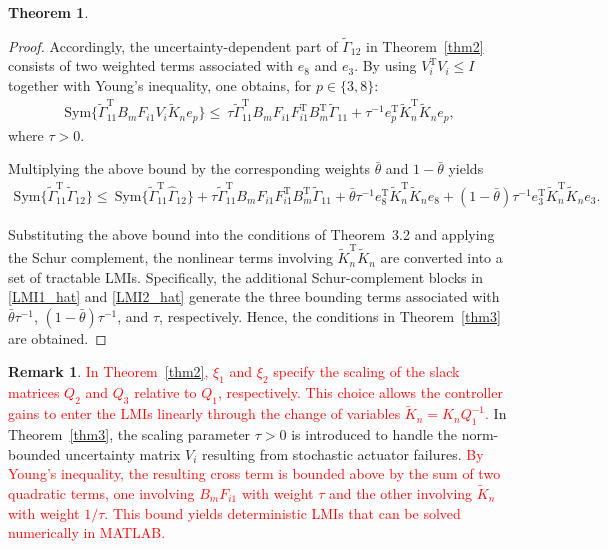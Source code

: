 \documentclass[preprint,review,fleqn,sort&compress,3p]{elsarticle}
\theoremstyle{definition} %
\theoremstyle{definition}%
\newtheorem{thm}{Theorem}[section]
\newtheorem{rem}{Remark}[section]
\begin{document}
\begin{thm}
\begin{proof}
			Accordingly, the uncertainty-dependent part of
			$\widetilde{\Gamma}_{12}$ in Theorem~\ref{thm2} consists of two weighted terms associated with
			$e_8$ and $e_3$. By using $V_i^{\mathrm T}V_i\le I$ together with Young's inequality, one obtains, for $p\in\{3,8\}$:
			\begin{align}
				\mathrm{Sym}
				\{
				\widetilde{\Gamma}_{11}^{\mathrm T}
				B_mF_{i1}V_i
				\widetilde{K}_n e_p
				\}
				\nonumber
				\le\
				\tau
				\widetilde{\Gamma}_{11}^{\mathrm T}
				B_mF_{i1}
				F_{i1}^{\mathrm T}
				B_m^{\mathrm T}
				\widetilde{\Gamma}_{11}
				+
				\tau^{-1}
				e_p^{\mathrm T}
				\widetilde{K}_n^{\mathrm T}
				\widetilde{K}_n
				e_p ,
			\end{align}
			where $\tau>0$.
			
			Multiplying the above bound by the corresponding weights
			$\bar{\theta}$ and $1-\bar{\theta}$ yields
			\begin{align}
				\mathrm{Sym}
				\{
				\widetilde{\Gamma}_{11}^{\mathrm T}
				\widetilde{\Gamma}_{12}
				\}
				\nonumber
				\le\
				\mathrm{Sym}
				\{
				\widetilde{\Gamma}_{11}^{\mathrm T}
				\widehat{\Gamma}_{12}
				\}
				+
				\tau
				\widetilde{\Gamma}_{11}^{\mathrm T}
				B_mF_{i1}
				F_{i1}^{\mathrm T}
				B_m^{\mathrm T}
				\widetilde{\Gamma}_{11}
				+
				\bar{\theta}\tau^{-1}
				e_8^{\mathrm T}
				\widetilde{K}_n^{\mathrm T}
				\widetilde{K}_n
				e_8
				+
				(1-\bar{\theta})\tau^{-1}
				e_3^{\mathrm T}
				\widetilde{K}_n^{\mathrm T}
				\widetilde{K}_n
				e_3 .
			\end{align}
			
			Substituting the above bound into the conditions of Theorem~3.2 and applying the Schur complement, the nonlinear terms involving $\widetilde{K}_n^{\mathrm T}\widetilde{K}_n$ are converted into a set of tractable LMIs.
			Specifically, the additional Schur-complement blocks in
			\eqref{LMI1_hat} and \eqref{LMI2_hat}
			generate the three bounding terms associated with
			$\bar{\theta}\tau^{-1}$, $(1-\bar{\theta})\tau^{-1}$, and $\tau$, respectively.
			Hence, the conditions in Theorem~\ref{thm3} are obtained.
		\end{proof}
		\begin{rem} \label{rem_robust_parameter}
			\textcolor{red}{In Theorem~\ref{thm2}, $\xi_1$ and $\xi_2$ specify the scaling of the slack matrices $Q_2$ and $Q_3$ relative to $Q_1$, respectively. This choice allows the controller gains to enter the LMIs linearly through the change of variables $\widetilde K_n=K_nQ_1^{-1}$.} In Theorem~\ref{thm3}, the scaling parameter $\tau > 0$ is introduced to handle the norm-bounded uncertainty matrix $V_i$ resulting from stochastic actuator failures. \textcolor{red}{By Young's inequality, the resulting cross term is bounded above by the sum of two quadratic terms, one involving $B_mF_{i1}$ with weight $\tau$ and the other involving $\widetilde K_n$ with weight $1/\tau$. This bound yields deterministic LMIs that can be solved numerically in MATLAB.}
		\end{rem}
		
		
	\end{thm}
	
\end{document}
